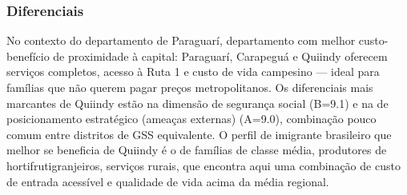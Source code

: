 \subsubsection*{Diferenciais}\label{dif-quiindy-0910}
No contexto do departamento de Paraguarí, departamento com melhor custo-benefício de proximidade à capital: Paraguarí, Carapeguá e Quiindy oferecem serviços completos, acesso à Ruta 1 e custo de vida campesino — ideal para famílias que não querem pagar preços metropolitanos. Os diferenciais mais marcantes de Quiindy estão na dimensão de segurança social (B=9.1) e na de posicionamento estratégico (ameaças externas) (A=9.0), combinação pouco comum entre distritos de GSS equivalente. O perfil de imigrante brasileiro que melhor se beneficia de Quiindy é o de famílias de classe média, produtores de hortifrutigranjeiros, serviços rurais, que encontra aqui uma combinação de custo de entrada acessível e qualidade de vida acima da média regional.
